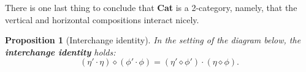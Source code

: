 \documentclass{article}
\newtheorem{prop}[thm]{Proposition}
\theoremstyle{definition}
\theoremstyle{remark}
\begin{document}
There is one last thing to conclude that \textbf{Cat} is a 2-category, namely, that the vertical and horizontal compositions interact nicely.
\begin{prop}[Interchange identity]
	In the setting of the diagram below, the \textbf{interchange identity} holds:
	\[(\eta' \cdot \eta) \diamond (\phi' \cdot \phi) = (\eta' \diamond \phi') \cdot (\eta \diamond \phi).\]
	\begin{figure}[h]
		\centering
	\end{figure}
\end{prop}
\end{document}
